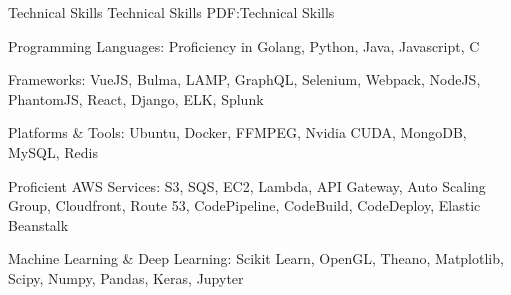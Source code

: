 \documentclass[letterpaper,MMMyyyy,nonstopmode]{simpleresumecv}
\begin{document}
\begin{Body}







\Section
{Technical Skills}
{Technical Skills}
{PDF:Technical Skills}

\BulletItem
Programming Languages: Proficiency in Golang, Python, Java, Javascript, C

\Gap
\BulletItem
Frameworks: VueJS, Bulma, LAMP, GraphQL, Selenium, Webpack, NodeJS, PhantomJS, React, Django, ELK, Splunk

\Gap
\BulletItem
Platforms \& Tools: Ubuntu, Docker, FFMPEG, Nvidia CUDA, MongoDB, MySQL, Redis

\Gap
\BulletItem
Proficient AWS Services: S3, SQS, EC2, Lambda, API Gateway, Auto Scaling Group, Cloudfront, Route 53, CodePipeline, CodeBuild, CodeDeploy, Elastic Beanstalk

\Gap
\BulletItem
Machine Learning \& Deep Learning: Scikit Learn, OpenGL, Theano, Matplotlib, Scipy, Numpy, Pandas, Keras, Jupyter

\end{Body}
\end{document}

